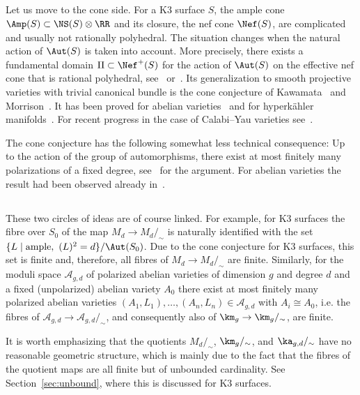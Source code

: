 \subsection{}
Let us move to the cone side. For a K3 surface $S$, the ample cone $\Amp(S)\subset\NS(S)\otimes\RR$ and its closure, the nef cone $\Nef (S)$, are complicated and usually not rationally polyhedral. The situation changes when the natural action of $\Aut(S)$ is taken into account. More precisely, there exists a fundamental domain $\Pi\subset\Nef ^+(S)$ for the action of $\Aut(S)$ on the effective nef cone that is rational polyhedral, see~\cite{Sterk} or~\cite[Chapter~8]{HuyK3}. Its generalization to smooth projective varieties with trivial canonical bundle is the cone conjecture of Kawamata~\cite{Kaw} and Morrison~\cite{Mor}. It has been proved for abelian varieties~\cite{PS} and for hyperk\"ahler manifolds~\cite{AmVerb,AmVerb2,MarYos}. For recent progress in the case of Calabi--Yau varieties see~\cite{LazPet}.

The cone conjecture has the following somewhat less technical consequence: Up to the action of the group of automorphisms, there exist at most finitely many polarizations of a fixed degree, see~\cite{Sterk} for the argument. For abelian varieties the result had been observed already in~\cite{NarNor}.

\subsection{}
These two circles of ideas are of course linked. For example, for K3 surfaces the fibre over $S_0$ of the map $M_d\to M_d/_\sim$ is naturally identified with the set $\{L\mid \text{ample},\ (L)^2=d\}/\Aut(S_0)$. Due to the cone conjecture for K3 surfaces, this set is finite and, therefore, all fibres of $M_d\to M_d/_\sim$ are finite. Similarly, for the moduli space ${\mathcal A}_{g,d}$ of polarized abelian varieties of dimension $g$ and degree $d$ and a fixed (unpolarized) abelian variety $A_0$ there exist at most finitely many polarized abelian varieties $(A_1,L_1), \dots,(A_n,L_n)\in {\mathcal A}_{g,d}$ with $A_i\cong A_0$, i.e. the fibres of ${\mathcal A}_{g,d}\to{\mathcal A}_{g,d}/_\sim$, and consequently also of $\km_g\to\km_g/_\sim$, are finite.

It is worth emphasizing that the quotients $M_d/_\sim$, $\km_g/_\sim$, and $\ka_{g,d}/_\sim$ have no reasonable geometric structure, which is mainly due to the fact that the fibres of the quotient maps are all finite but of unbounded cardinality. See Section~\ref{sec:unbound}, where this is discussed for K3 surfaces.

